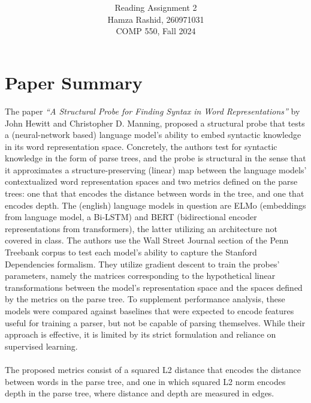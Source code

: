 \documentclass[11pt]{article}
\title{ }
\author{ Reading Assignment 2 \\ Hamza Rashid, 260971031 \\ COMP 550, Fall 2024}
\date{}
\begin{document}
\maketitle

\vspace{-5ex}
\section*{Paper Summary}
The paper \textit{“A Structural Probe for Finding 
Syntax in Word Representations”} by John Hewitt and Christopher D. Manning,
proposed a structural probe that tests a (neural-network based) 
language model's ability to embed syntactic knowledge 
in its word representation space. Concretely, the authors
test for syntactic knowledge in the form of parse trees, and
the probe is structural in the sense that it approximates
a structure-preserving (linear) map
between the language models' contextualized word representation spaces and 
two metrics defined on the parse trees: one that that encodes the
distance between words in the tree, and one that encodes depth.
The (english) language models in question are ELMo (embeddings from language model, a Bi-LSTM)
and BERT (bidirectional encoder representations from transformers), 
the latter utilizing an architecture not covered in class. The authors use the Wall Street Journal section of the 
Penn Treebank corpus to test each model's ability to capture
the Stanford Dependencies formalism. They utilize gradient descent
to train the probes' parameters, namely the matrices corresponding 
to the hypothetical linear transformations between the model's representation space
and the spaces defined by the metrics on the parse tree.
To supplement performance analysis, these models
were compared against baselines that were expected to 
encode features useful for training a parser, but not be capable of
parsing themselves. While their approach is effective,
it is limited by its strict formulation and reliance on supervised learning.
\\
\\
The proposed metrics consist of a squared L2 distance that encodes the 
distance between words in the parse tree, and
one in which squared L2 norm encodes depth in the parse tree, 
where distance and depth are measured in edges.
\end{document}

